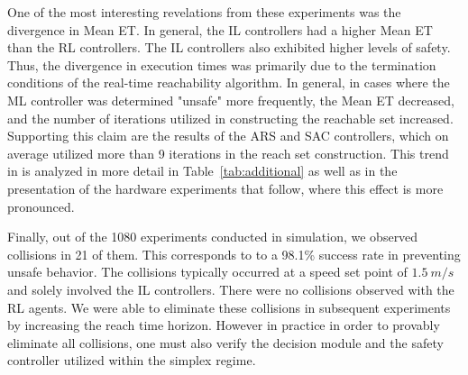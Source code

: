 \documentclass[manuscript,screen,review]{acmart}
\newcommand{\todo}[1]{\textcolor{red}{\textbf{\underline{TODO:}} #1}}
\begin{document}


One of the most interesting revelations from these experiments was the divergence in Mean ET. In general, the IL controllers had a higher Mean ET than the RL controllers. The IL controllers
also exhibited higher levels of safety. Thus, the divergence in execution times was primarily due to the termination conditions of the real-time reachability algorithm. In general, in cases where the ML controller was determined "unsafe" more frequently, the Mean ET decreased, and the number of iterations utilized in constructing the reachable set increased. Supporting this claim are the results of the ARS and SAC controllers, which on average utilized more than 9 iterations in the reach set construction. This trend in is analyzed in more detail in Table~\ref{tab:additional} as well as in the presentation of the hardware experiments that follow, where this effect is more pronounced.

Finally, out of the 1080 experiments conducted in simulation, we observed collisions in 21 of them. This corresponds to to a 98.1\% success rate in preventing unsafe behavior. The collisions typically occurred at a speed set point of $1.5 \ m/s$ and solely involved the IL controllers. There were no collisions observed with the RL agents. We were able to eliminate these collisions in subsequent experiments by increasing the reach time horizon. However in practice in order to provably eliminate all collisions, one must also verify the decision module and the safety controller utilized within the simplex regime.





\end{document}
